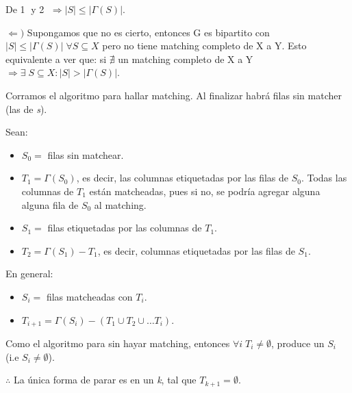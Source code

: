 \documentclass[12pt,a4paper]{report}
\newcounter{neq}
\begin{document}
			De \textcircled{1} y \textcircled{2} $\Rightarrow \lvert S \rvert \leq \lvert \Gamma(S) \rvert$.
			
			\vspace{5mm}
			$\Leftarrow)$ Supongamos que no es cierto, entonces G es bipartito con $\lvert S \rvert \leq \lvert \Gamma(S) \rvert \; \forall S \subseteq X$ pero no tiene matching completo de X a Y. Esto equivalente a ver que: si $\nexists$ un matching completo de X a Y $\Rightarrow \exists \; S \subseteq X : \lvert S \rvert > \lvert \Gamma(S) \rvert$.
			
			\vspace{5 mm}
			Corramos el algoritmo para hallar matching. Al finalizar habrá filas sin matcher (las de \textit{s}).
			
			\vspace{5mm}
			Sean:
			\begin{itemize}
				\item $S_{0} =$ filas sin matchear.
				\item $T_{1} = \Gamma(S_{0})$, es decir, las columnas etiquetadas por las filas de $S_{0}$. Todas las columnas de $T_{1}$ están matcheadas, pues si no, se podría agregar alguna alguna fila de $S_{0}$ al matching.
				\item $S_{1} =$ filas etiquetadas por las columnas de $T_{1}$.
				\item $T_{2} = \Gamma(S_{1}) - T_{1}$, es decir, columnas etiquetadas por las filas de $S_{1}$. 
			\end{itemize}
	
			En general:
			\begin{center}
			\begin{itemize}
				\item $S_{i} =$ filas matcheadas con $T_{i}$.
				\item $T_{i+1} = \Gamma(S_{i}) - (T_{1} \cup T_{2} \cup \dotsc T_{i})$.
			\end{itemize}
			\end{center}
			
			Como el algoritmo para sin hayar matching, entonces $\forall i \; T_{i} \neq \emptyset $, produce un $S_{i}$  (i.e $S_{i} \neq \emptyset$).
			
			$\therefore$ La única forma de parar es en un \textit{k}, tal que $T_{k+1} = \emptyset$.
			
\end{document}
